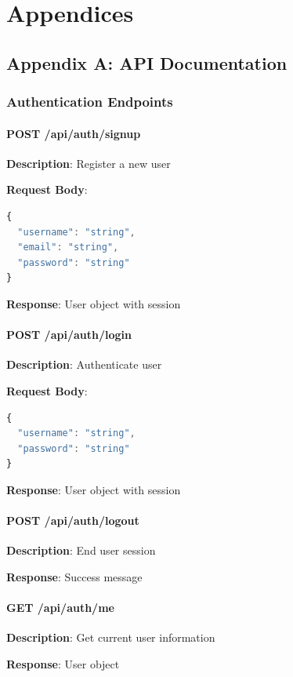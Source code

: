 \documentclass{scrreprt}
\begin{document}
\chapter{Appendices}

\section{Appendix A: API Documentation}

\subsection{Authentication Endpoints}

\subsubsection{POST /api/auth/signup}
\textbf{Description}: Register a new user

\textbf{Request Body}:
\begin{lstlisting}[language=JavaScript]
{
  "username": "string",
  "email": "string",
  "password": "string"
}
\end{lstlisting}

\textbf{Response}: User object with session

\subsubsection{POST /api/auth/login}
\textbf{Description}: Authenticate user

\textbf{Request Body}:
\begin{lstlisting}[language=JavaScript]
{
  "username": "string",
  "password": "string"
}
\end{lstlisting}

\textbf{Response}: User object with session

\subsubsection{POST /api/auth/logout}
\textbf{Description}: End user session

\textbf{Response}: Success message

\subsubsection{GET /api/auth/me}
\textbf{Description}: Get current user information

\textbf{Response}: User object
\end{document}
